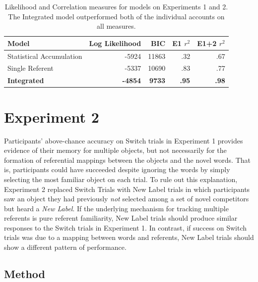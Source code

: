 \documentclass{pnastwo}
\begin{document}
\begin{article}
\begin{table}
\begin{center}
\begin{tabular}{lrrrr}
\hline
Model & Log Likelihood &BIC & E1 $r^{2}$ & E1+2 $r^{2}$ \\
\hline
Statistical Accumulation & -5924 & 11863 & .32  & .67\\
Single Referent & -5337 & 10690 & .83 & .77 \\
\textbf{Integrated} & \textbf{-4854} & \textbf{9733} & \textbf{.95}  & \textbf{.98}\\
\hline
\end{tabular}
\end{center}
\caption{\label{tab:model}Likelihood and Correlation measures for models on Experiments 1 and 2. The Integrated model outperformed both of the individual accounts on all measures.}
\end{table}




\section{Experiment 2}

Participants' above-chance accuracy on Switch trials in Experiment 1 provides evidence of their memory for multiple objects, but not necessarily for the formation of referential mappings between the objects and the novel words. That is, participants could have succeeded despite ignoring the words by simply selecting the most familiar object on each trial. To rule out this explanation, Experiment 2 replaced Switch Trials with New Label trials in which participants saw an object they had previously \emph{not} selected among a set of novel competitors but heard a \emph{New Label}.
If the underlying mechanism for tracking multiple referents is pure referent familiarity, New Label trials should produce similar responses to the Switch trials in Experiment 1. In contrast, if success on Switch trials was due to a mapping between words and referents, New Label trials should show a different pattern of performance.

\subsection{Method}


\end{article}
\end{document}
